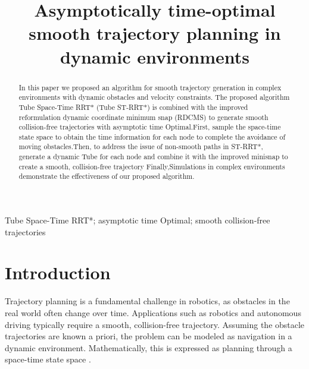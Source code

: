 \documentclass[conference]{IEEEtran}
\begin{document}
    \title
    {
        Asymptotically time-optimal smooth trajectory planning in dynamic environments\\
    }

    \author
    {
        \and
    }

    \maketitle

    \begin{abstract}
        In this paper we proposed an algorithm for smooth trajectory generation in complex environments with dynamic obstacles and velocity constraints. The proposed algorithm Tube Space-Time RRT* (Tube ST-RRT*) is combined with the improved reformulation dynamic coordinate minimum snap (RDCMS) to generate smooth collision-free trajectories with asymptotic time Optimal.First, sample the space-time state space to obtain the time information for each node to complete the avoidance of moving obstacles.Then, to address the issue of non-smooth paths in ST-RRT*, generate a dynamic Tube for each node and combine it with the improved minisnap to create a smooth, collision-free trajectory Finally,Simulations in complex environments demonstrate the effectiveness of our proposed algorithm.
    \end{abstract}

    \begin{IEEEkeywords}
        Tube Space-Time RRT*; asymptotic time Optimal; smooth collision-free trajectories
    \end{IEEEkeywords}

    \section{Introduction}
        Trajectory planning is a fundamental challenge in robotics\cite{b1}, as obstacles in the real world often change over time. Applications such as robotics and autonomous driving typically require a smooth, collision-free trajectory. Assuming the obstacle trajectories are known a priori, the problem can be modeled as navigation in a dynamic environment. Mathematically, this is expressed as planning through a space-time state space \cite{b2}.
\end{document}
